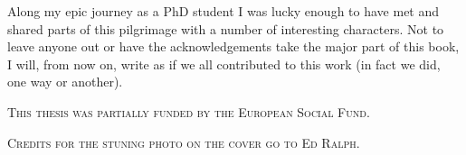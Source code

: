 








\begin{acknowledgements}

Along my epic journey as a PhD student I was lucky enough to have met and shared parts of this pilgrimage with a number of interesting characters. Not to leave anyone out or have the acknowledgements take the major part of this book, I will, from now on, write as if we all contributed to this work (in fact we did, one way or another).

\end{acknowledgements}

\vfill

\begin{center}
	\textsc{This thesis was partially funded by the European Social Fund.}
	
	\vspace{.2cm}
	
	\textsc{Credits for the stuning photo on the cover go to Ed Ralph.}
\end{center}